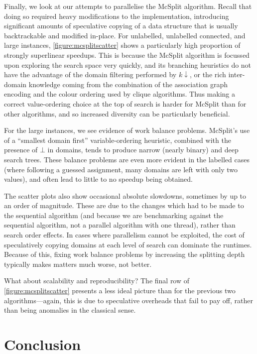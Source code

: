 \documentclass[sigconf]{acmart}
\begin{document}
Finally, we look at our attempts to parallelise the McSplit algorithm. Recall that doing so required
heavy modifications to the implementation, introducing significant amounts of speculative copying of a
data structure that is usually backtrackable and modified in-place. For unlabelled, unlabelled
connected, and large instances, \cref{figure:mcsplitscatter} shows a particularly high proportion of
strongly superlinear speedups. This is because the McSplit algorithm is focussed upon
exploring the search space very quickly, and its branching heuristics do not have the advantage of
the domain filtering performed by $k{\downarrow}$, or the rich inter-domain knowledge coming from
the combination of the association graph encoding and the colour ordering used by clique algorithms.
Thus making a correct value-ordering choice at the top of search is harder for McSplit than for
other algorithms, and so increased diversity can be particularly beneficial.

For the large instances, we see evidence of work balance problems. McSplit's use of a ``smallest
domain first'' variable-ordering heuristic, combined with the presence of $\bot$ in domains, tends
to produce narrow (nearly binary) and deep search trees. These balance problems are even more
evident in the labelled cases (where following a guessed assignment, many domains are left with only
two values), and often lead to little to no speedup being obtained.

The scatter plots also show occasional absolute slowdowns, sometimes by up to an order of magnitude.
These are due to the changes which had to be made to the sequential algorithm (and because we are
benchmarking against the sequential algorithm, not a parallel algorithm with one thread), rather
than search order effects. In cases where parallelism cannot be exploited, the cost of speculatively
copying domains at each level of search can dominate the runtimes. Because of this, fixing work
balance problems by increasing the splitting depth typically makes matters much worse, not better.

What about scalability and reproducibility? The final row of \cref{figure:mcsplitscatter} presents a
less ideal picture than for the previous two algorithms---again, this is due to speculative
overheads that fail to pay off, rather than being anomalies in the classical sense.

\section{Conclusion}
\end{document}
